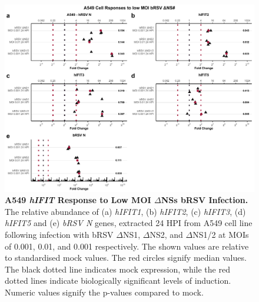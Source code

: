 \begin{figure}
    \centering
    \includegraphics[width=1\linewidth]{06. Chapter 1/Figs/01. Induction/08. a549_brsv_dns.pdf}
    \caption[A549 \textit{hIFIT} Response to Low MOI \(\Delta\)NSs bRSV Infection.]{\textbf{A549 \textit{hIFIT} Response to Low MOI \(\Delta\)NSs bRSV Infection.} The relative abundance of (a) \textit{hIFIT1}, (b) \textit{hIFIT2}, (c) \textit{hIFIT3}, (d) \textit{hIFIT5} and (e) \textit{bRSV N} genes, extracted 24 HPI from A549 cell line following infection with bRSV \(\Delta\)NS1, \(\Delta\)NS2, and \(\Delta\)NS1/2 at MOIs of 0.001, 0.01, and 0.001 respectively. The shown values are relative to standardised mock values. The red circles signify median values. The black dotted line indicates mock expression, while the red dotted lines indicate biologically significant levels of induction. Numeric values signify the p-values compared to mock.}
    \label{fig:Responses of A549 to bRSV dNSs.}
\end{figure}

